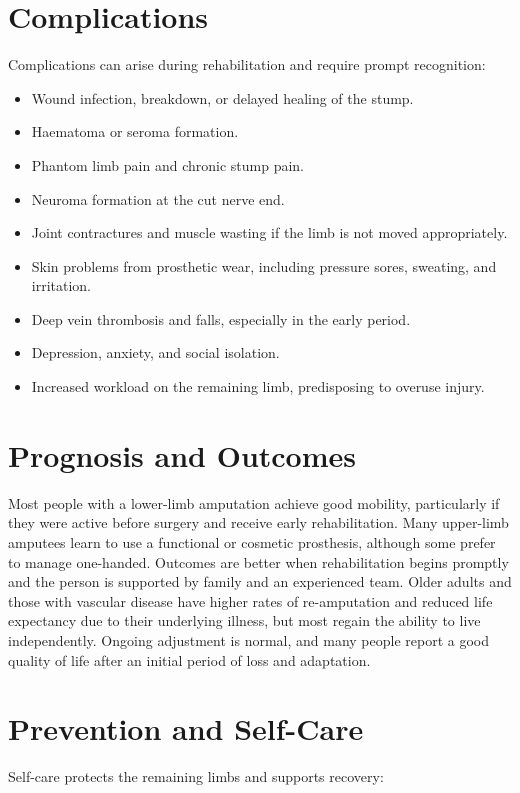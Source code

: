 \section*{Complications}
Complications can arise during rehabilitation and require prompt recognition:

\begin{itemize}
    \item Wound infection, breakdown, or delayed healing of the stump.
    \item Haematoma or seroma formation.
    \item Phantom limb pain and chronic stump pain.
    \item Neuroma formation at the cut nerve end.
    \item Joint contractures and muscle wasting if the limb is not moved appropriately.
    \item Skin problems from prosthetic wear, including pressure sores, sweating, and irritation.
    \item Deep vein thrombosis and falls, especially in the early period.
    \item Depression, anxiety, and social isolation.
    \item Increased workload on the remaining limb, predisposing to overuse injury.
\end{itemize}

\section*{Prognosis and Outcomes}
Most people with a lower-limb amputation achieve good mobility, particularly if they were active before surgery and receive early rehabilitation. Many upper-limb amputees learn to use a functional or cosmetic prosthesis, although some prefer to manage one-handed. Outcomes are better when rehabilitation begins promptly and the person is supported by family and an experienced team. Older adults and those with vascular disease have higher rates of re-amputation and reduced life expectancy due to their underlying illness, but most regain the ability to live independently. Ongoing adjustment is normal, and many people report a good quality of life after an initial period of loss and adaptation.

\section*{Prevention and Self-Care}
Self-care protects the remaining limbs and supports recovery:

